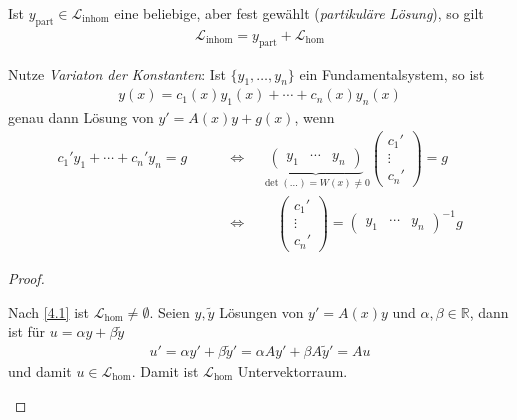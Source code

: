 \begin{theorem}[Satz]
\begin{enum-arab}
\begin{enum-alph}
					Ist $y_{\text{part}} \in \mathcal L_{\text{inhom}}$ eine beliebige, aber fest gewählt (\emph{partikuläre Lösung}), so gilt
					\begin{align*}
						\mathcal L_{\text{inhom}} = y_{\text{part}} + \mathcal L_{\text{hom}}
					\end{align*}
				\item
					Nutze \emph{Variaton der Konstanten}:
					Ist $\{y_1,\dotsc, y_n\}$ ein Fundamentalsystem, so ist
					\begin{align*}
						y(x) = c_1(x) y_1(x) + \dotsb + c_n(x) y_n(x)
					\end{align*}
					genau dann Lösung von $y' = A(x)y + g(x)$, wenn
					\begin{align*}
						c_1'y_1 + \dotsb + c_n'y_n = g
						\qquad &\iff \quad
						\underbrace{\begin{pmatrix}
							y_1 & \cdots & y_n
						\end{pmatrix}}_{\det(\dotsc) = W(x) \neq 0} \begin{pmatrix}
							c_1' \\ \vdots \\ c_n'
						\end{pmatrix} = g \\
						& \iff \qquad \begin{pmatrix}
							c_1' \\ \vdots \\ c_n'
						\end{pmatrix} = \begin{pmatrix}
							y_1 & \cdots & y_n
						\end{pmatrix}^{-1} g
					\end{align*}
			\end{enum-alph}
	\end{enum-arab}
	\begin{proof}
		\begin{enum-arab}
        \item
          \begin{enum-alph}
			\item
				Nach \ref{4.1} ist $\mathcal L_{\text{hom}} \neq \emptyset$.
				Seien $y, \tilde y$ Lösungen von $y' = A(x)y$ und $\alpha, \beta \in \mathbb{R}$, dann ist für $u = \alpha y + \beta \tilde y$
				\begin{align*}
					u' = \alpha y' + \beta \tilde y' = \alpha Ay' + \beta A \tilde y' = Au
				\end{align*}
				und damit $u \in \mathcal L_{\text{hom}}$.
				Damit ist $\mathcal L_{\text{hom}}$ Untervektorraum.

\end{enum-alph}
\end{enum-arab}
\end{proof}
\end{theorem}
